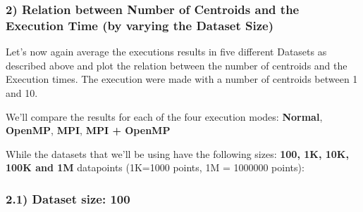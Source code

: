 \documentclass[11pt]{article}
\begin{document}
    \hypertarget{relation-between-number-of-centroids-and-the-execution-time-by-varying-the-dataset-size}{%
\subsubsection{2) Relation between Number of Centroids and the Execution
Time (by varying the Dataset
Size)}\label{relation-between-number-of-centroids-and-the-execution-time-by-varying-the-dataset-size}}

Let's now again average the executions results in five different
Datasets as described above and plot the relation between the number of
centroids and the Execution times. The execution were made with a number
of centroids between 1 and 10.

We'll compare the results for each of the four execution modes:
\textbf{Normal}, \textbf{OpenMP}, \textbf{MPI}, \textbf{MPI + OpenMP}

While the datasets that we'll be using have the following sizes:
\textbf{100, 1K, 10K, 100K and 1M} datapoints (1K=1000 points, 1M =
1000000 points):

    \hypertarget{dataset-size-100}{%
\subsubsection{2.1) Dataset size: 100}\label{dataset-size-100}}
\end{document}
